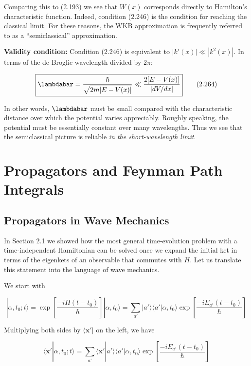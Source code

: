 \documentclass[11pt,a4paper]{article}
\begin{document}
Comparing this to (2.193) we see that $W(x)$ corresponds directly to Hamilton's characteristic function. Indeed, condition (2.246) is the condition for reaching the classical limit. For these reasons, the WKB approximation is frequently referred to as a ``semiclassical'' approximation.

\textbf{Validity condition:}
Condition (2.246) is equivalent to $|k'(x)| \ll |k^2(x)|$. In terms of the de Broglie wavelength divided by $2\pi$:

\begin{equation}
\boxed{\lambdabar = \frac{\hbar}{\sqrt{2m[E - V(x)]}} \ll \frac{2[E - V(x)]}{|dV/dx|}}
\tag{2.264}
\end{equation}

In other words, $\lambdabar$ must be small compared with the characteristic distance over which the potential varies appreciably. Roughly speaking, the potential must be essentially constant over many wavelengths. Thus we see that the semiclassical picture is reliable \textit{in the short-wavelength limit}.

\newpage
\section{Propagators and Feynman Path Integrals}

\subsection{Propagators in Wave Mechanics}

In Section 2.1 we showed how the most general time-evolution problem with a time-independent Hamiltonian can be solved once we expand the initial ket in terms of the eigenkets of an observable that commutes with $H$. Let us translate this statement into the language of wave mechanics.

We start with

\begin{equation}
|\alpha, t_0; t\rangle = \exp\left[\frac{-iH(t - t_0)}{\hbar}\right]|\alpha, t_0\rangle = \sum_{a'} |a'\rangle\langle a'|\alpha, t_0\rangle \exp\left[\frac{-iE_{a'}(t - t_0)}{\hbar}\right]
\tag{2.265}
\end{equation}

Multiplying both sides by $\langle \mathbf{x}'|$ on the left, we have

\begin{equation}
\langle \mathbf{x}'|\alpha, t_0; t\rangle = \sum_{a'} \langle \mathbf{x}'|a'\rangle\langle a'|\alpha, t_0\rangle \exp\left[\frac{-iE_{a'}(t - t_0)}{\hbar}\right]
\tag{2.266}
\end{equation}
\end{document}
